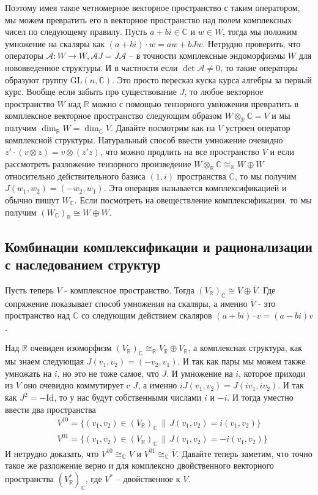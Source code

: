Поэтому имея такое четномерное векторное пространство с таким оператором, мы
можем превратить его в векторное пространство над полем комплексных чисел по
следующему правилу. Пусть $a+bi\in\mathbb C$ и $w\in W$, тогда мы положим
умножение на скаляры как $(a+bi)\cdot w=aw+bJw$. Нетрудно проверить, что операторы
$\mathcal A:W\rightarrow W, \mathcal AJ=J\mathcal A$ – в точности комплексные 
эндоморфизмы $W$ для нововведенное структуры. И в частности если $\det\mathcal A
\neq 0$, то такие операторы образуют группу $\text{GL}(n,\mathbb C)$. Это просто
пересказ куска курса алгебры за первый курс. Вообще если забыть про существование
$J$, то любое векторное пространство $W$ над $\mathbb R$ можно с помощью тензорного
умножения превратить в комплексное векторное пространство следующим образом
$W\otimes_{\mathbb R}\mathbb C=V$ и мы получим $\dim_{\mathbb R}W=\dim_{\mathbb C}V$.
Давайте посмотрим как на $V$ устроен оператор комплексной структуры. Натуральный
способ ввести умножение очевидно $z'\cdot(v\otimes z)=v\otimes(z'z)$, что можно
продлить на все пространство $V$ и если
рассмотреть разложение тензорного произведение $W\otimes_{\mathbb R}\mathbb C
\cong_{\mathbb R} W\oplus W$ относительно действительного базиса $(1,i)$ пространства
$\mathbb C$, то мы получим $J(w_1,w_2)=(-w_2,w_1)$. Эта операция называется комплексификацией
и обычно пишут $W_{\mathbb C}$. Если посмотреть на овеществление комплексификации,
то мы получим $(W_{\mathbb C})_{\mathbb R}\cong W\oplus W$.

\subsection{Комбинации комплексификации и рационализации с наследованием структур}
Пусть теперь $V$ - комплексное пространство. Тогда $(V_{\mathbb R})_{\mathbb C}
\cong V\oplus\overline V$. Где сопряжение показывает способ умножения на скаляры,
а именно $\overline V$ - это пространство над $\mathbb C$ со следующим действием
скаляров $(a+bi)\cdot v=(a-bi)v$.

Над $\mathbb R$ очевиден изоморфизм $(V_{\mathbb R})_{\mathbb C}\cong_{\mathbb R}
V_{\mathbb R}\oplus V_{\mathbb R}$, а комплексная структура, как мы знаем
следующая $J(v_1, v_2)=(-v_2, v_1)$. И так как пары мы можем также умножать на
$i$, но это не тоже самое, что $J$. И умножение на $i$, которое приходи из $V$ оно
очевидно коммутирует c $J$, а именно $iJ(v_1, v_2)=J(iv_1, iv_2)$. И так как
$J^2=-\text{Id}$, то у нас будут собственными числами $i$ и $-i$. И тогда уместно
ввести два пространства
\begin{align*}
    &V^{10}=\{(v_1,v_2)\in (V_{\mathbb R})_{\mathbb C}\,\|\,J(v_1,v_2)=i(v_1,v_2)\}\\
    &V^{01}=\{(v_1,v_2)\in (V_{\mathbb R})_{\mathbb C}\,\|\,J(v_1,v_2)=-i(v_1,v_2)\}
\end{align*}
И нетрудно доказать, что $V^{10}\cong_{\mathbb C} V$ и $V^{01}\cong_{\mathbb C}
\overline V$.
Давайте теперь заметим, что точно такое же разложение верно и для комплексно 
двойственного векторного пространства $(V^*_{\mathbb R})_{\mathbb C}$, где $V^*$
– двойственное к $V$.

